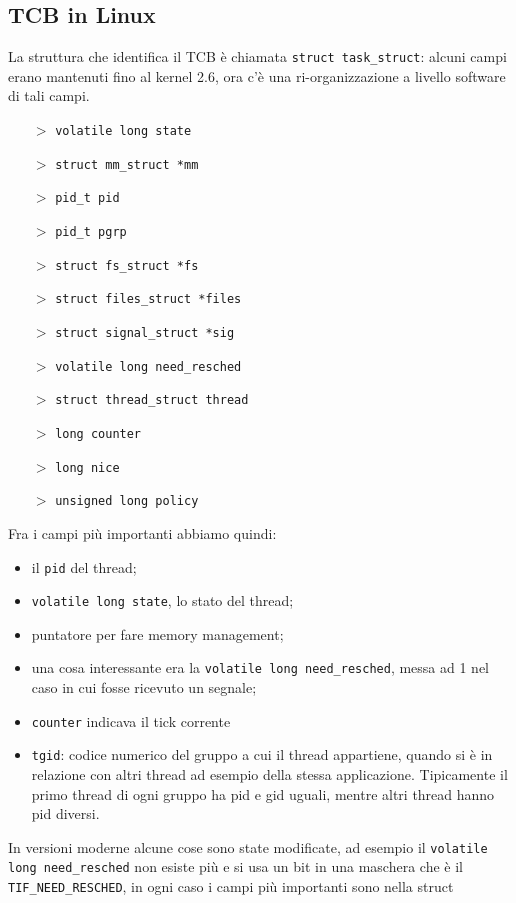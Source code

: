 \documentclass[12pt, oneside]{extbook}
\begin{document}
\subsection{TCB in Linux}
La struttura che identifica il TCB è chiamata \texttt{struct task\_struct}: alcuni campi erano mantenuti fino al kernel 2.6, ora c'è una ri-organizzazione a livello software di tali campi.
\begin{itemize}
	\item[$>$] \texttt{volatile long state}
	\item[$>$] \texttt{struct mm\_struct *mm}
	\item[$>$] \texttt{pid\_t pid}
	\item[$>$] \texttt{pid\_t pgrp}
	\item[$>$] \texttt{struct fs\_struct *fs}
	\item[$>$] \texttt{struct files\_struct *files}
	\item[$>$] \texttt{struct signal\_struct *sig}
	\item[$>$] \texttt{volatile long need\_resched}
	\item[$>$] \texttt{struct thread\_struct thread}
	\item[$>$] \texttt{long counter}
	\item[$>$] \texttt{long nice}
	\item[$>$] \texttt{unsigned long policy}
\end{itemize}
Fra i campi più importanti abbiamo quindi:
\begin{itemize}
\item il \texttt{pid} del thread;
\item \texttt{volatile long state}, lo stato del thread;
\item puntatore per fare memory management;
\item una cosa interessante era la \texttt{volatile long need\_resched}, messa ad 1 nel caso in cui fosse ricevuto un segnale;
\item \texttt{counter} indicava il tick corrente
\item \texttt{tgid}: codice numerico del gruppo a cui il thread appartiene, quando si è in relazione con altri thread ad esempio della stessa applicazione. Tipicamente il primo thread di ogni gruppo ha pid e gid uguali, mentre altri thread hanno pid diversi.
\end{itemize}
In versioni moderne alcune cose sono state modificate, ad esempio il \texttt{volatile long need\_resched} non esiste più e si usa un bit in una maschera che è il  \texttt{TIF\_NEED\_RESCHED}, in ogni caso i campi più importanti sono nella struct
\end{document}

